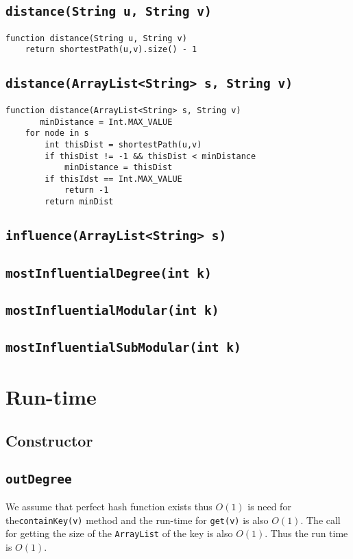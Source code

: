 \documentclass[10pt,letterpaper]{article}
\begin{document}
\subsection{\texttt{distance(String u, String v)}}
\begin{verbatim}
function distance(String u, String v) 
   	return shortestPath(u,v).size() - 1
\end{verbatim}
\subsection{\texttt{distance(ArrayList<String> s, String v)}}
\begin{verbatim}
function distance(ArrayList<String> s, String v) 
       minDistance = Int.MAX_VALUE
    for node in s
        int thisDist = shortestPath(u,v)
        if thisDist != -1 && thisDist < minDistance
            minDistance = thisDist
        if thisIdst == Int.MAX_VALUE
            return -1
        return minDist
\end{verbatim}
\subsection{\texttt{influence(ArrayList<String> s)}}
\subsection{\texttt{mostInfluentialDegree(int k)}}
\subsection{\texttt{mostInfluentialModular(int k)}}
\subsection{\texttt{mostInfluentialSubModular(int k)}}
\section{Run-time}
\subsection{Constructor}
\subsection{\texttt{outDegree}}
We assume that perfect hash function exists thus $O(1)$ is need for the\texttt{containKey(v)} method and the run-time for \texttt{get(v)} is also $O(1)$. The call for getting the size of the \texttt{ArrayList} of the key is also $O(1)$.
Thus the run time is $O(1)$.
\end{document}
